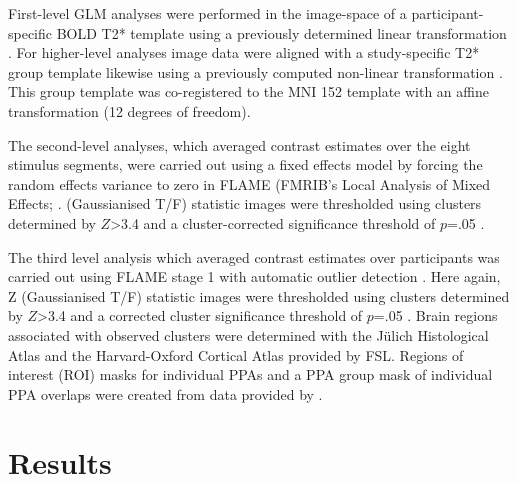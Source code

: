 \documentclass[english]{article}
\begin{document}
First-level GLM analyses were performed in the image-space of a
participant-specific BOLD T2* template using a previously determined linear
transformation \citep{sengupta2016extension}.
For higher-level analyses image data were aligned with a study-specific T2*
group template likewise using a previously computed non-linear transformation
\citep{hanke2014audiomovie}.
This group template was co-registered to the MNI 152 template with an affine
transformation (12 degrees of freedom).

The second-level analyses, which averaged contrast estimates over the eight
stimulus segments, were carried out using a fixed effects model by forcing the
random effects variance to zero in FLAME (FMRIB's Local Analysis of Mixed
Effects; \citep{beckmann2003general, woolrich2004multilevel}.
(Gaussianised T/F) statistic images were thresholded using clusters determined
by $Z$>3.4 and a cluster-corrected significance threshold of $p$=.05
\citep{worsley2001statistical}.

The third level analysis which averaged contrast estimates over participants was
carried out using FLAME stage 1 with automatic outlier detection
\citep{beckmann2003general, woolrich2004multilevel, woolrich2008robust}.
Here again, Z (Gaussianised T/F) statistic images were thresholded using
clusters determined by $Z$>3.4 and a corrected cluster significance threshold of
$p$=.05 \citep{worsley2001statistical}.
Brain regions associated with observed clusters were determined with the Jülich
Histological Atlas \citep{eickhoff2005toolbox, eickhoff2007assignment} and the
Harvard-Oxford Cortical Atlas \citep{desikan2006automated} provided by FSL.
Regions of interest (ROI) masks for individual PPAs and a PPA group mask of
individual PPA overlaps were created from data provided by
\citep{sengupta2016extension}.


\section{Results}
\end{document}
